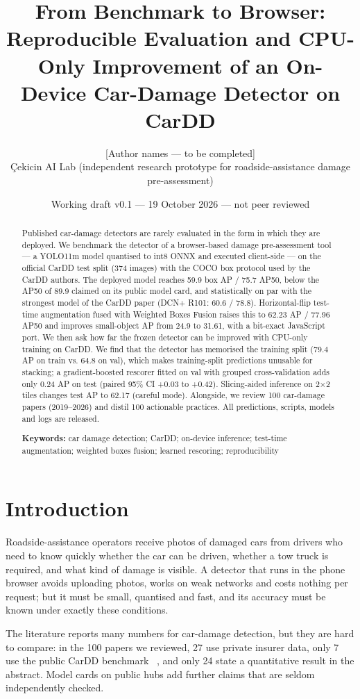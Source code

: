 \documentclass[10pt,twocolumn]{article}
\title{From Benchmark to Browser: Reproducible Evaluation and CPU-Only Improvement of an On-Device Car-Damage Detector on CarDD}
\author{[Author names --- to be completed]\\ \small Çekicin AI Lab (independent research prototype for roadside-assistance damage pre-assessment)}
\date{Working draft v0.1 --- 19 October 2026 --- not peer reviewed}
\begin{document}
\maketitle
\begin{abstract}
Published car-damage detectors are rarely evaluated in the form in which they are deployed. We benchmark the detector of a browser-based damage pre-assessment tool --- a YOLO11m model quantised to int8 ONNX and executed client-side --- on the official CarDD test split (374 images) with the COCO box protocol used by the CarDD authors. The deployed model reaches 59.9 box AP / 75.7 AP50, below the AP50 of 89.9 claimed on its public model card, and statistically on par with the strongest model of the CarDD paper (DCN+ R101: 60.6 / 78.8). Horizontal-flip test-time augmentation fused with Weighted Boxes Fusion raises this to 62.23 AP / 77.96 AP50 and improves small-object AP from 24.9 to 31.61, with a bit-exact JavaScript port. We then ask how far the frozen detector can be improved with CPU-only training on CarDD. We find that the detector has memorised the training split (79.4 AP on train vs. 64.8 on val), which makes training-split predictions unusable for stacking; a gradient-boosted rescorer fitted on val with grouped cross-validation adds only 0.24 AP on test (paired 95\% CI +0.03 to +0.42). Slicing-aided inference on 2$\times$2 tiles changes test AP to 62.17 (careful mode). Alongside, we review 100 car-damage papers (2019--2026) and distil 100 actionable practices. All predictions, scripts, models and logs are released.
\par\smallskip\noindent\textbf{Keywords:} car damage detection; CarDD; on-device inference; test-time augmentation; weighted boxes fusion; learned rescoring; reproducibility
\end{abstract}
\section{Introduction}
Roadside-assistance operators receive photos of damaged cars from drivers who need to know quickly whether the car can be driven, whether a tow truck is required, and what kind of damage is visible. A detector that runs in the phone browser avoids uploading photos, works on weak networks and costs nothing per request; but it must be small, quantised and fast, and its accuracy must be known under exactly these conditions.

The literature reports many numbers for car-damage detection, but they are hard to compare: in the 100 papers we reviewed, 27 use private insurer data, only 7 use the public CarDD benchmark ~\cite{cardd}, and only 24 state a quantitative result in the abstract. Model cards on public hubs add further claims that are seldom independently checked.
\end{document}
